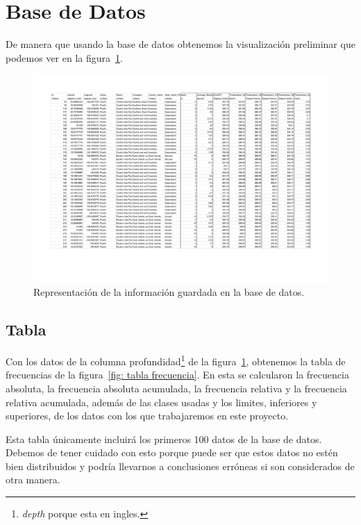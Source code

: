\documentclass[12pt]{article}
\begin{document}
\section{Base de Datos}

	\par De manera que usando la base de datos \cite{db} obtenemos la visualización preliminar que podemos ver en la figura~\ref{fig: tabla}.
	
	\begin{figure}[h]
	\centering
		\includegraphics[height=0.6\textheight]{dataset_coral.png}
	\caption{Representación de la información guardada en la base de datos.}
	\label{fig: tabla}
\end{figure}

	
	
\subsection{Tabla}

	\par Con los datos de la columna profundidad\footnote{\textit{depth} porque esta en ingles. } de la figura~\ref{fig: tabla}, obtenemos la tabla de frecuencias de la figura~\ref{fig: tabla frecuencia}. En esta se calcularon la frecuencia absoluta, la frecuencia absoluta acumulada, la frecuencia relativa y la frecuencia relativa acumulada, adem\'as de las clases usadas y los limites, inferiores y superiores, de los datos con los que trabajaremos en este proyecto.
	\par Esta tabla \'unicamente incluirá los primeros 100 datos de la base de datos. Debemos de tener cuidado con esto porque puede ser que estos datos no estén bien distribuidos y podría llevarnos a conclusiones erróneas si son considerados de otra manera.
\end{document}
